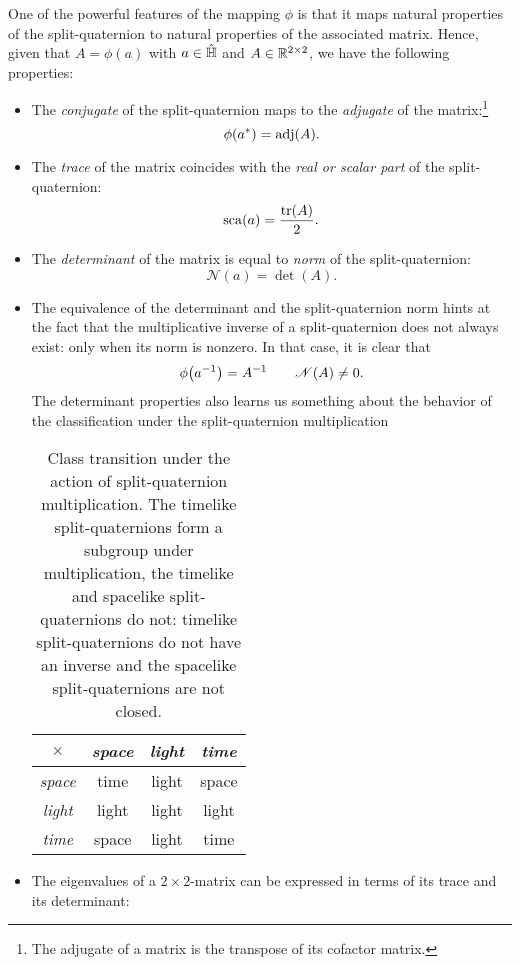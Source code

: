 One of the powerful features of the mapping $\phi$ is that it maps natural properties of the split-quaternion to natural properties of the associated matrix. Hence, given that $A = \phi(a)$ with $a \in \hat{\mathbb{H}}$ and $A \in \mathbb{R}^{2\times2}$, we have the following properties: 
\begin{itemize}
    \item The \emph{conjugate} of the split-quaternion maps to the \emph{adjugate} of the matrix:\footnote
        {The adjugate of a matrix is the transpose of its cofactor matrix.}
        $$ \phi(a^*) = \operatorname{adj}(A). $$
    \item The \emph{trace} of the matrix coincides with the \emph{real or scalar part} of the split-quaternion:
        $$ \scapart{a} = \frac{\trace(A)}{2}. $$
    \item The \emph{determinant} of the matrix is equal to \emph{norm} of the split-quaternion:
        $$ \mathscr{N}(a) = \det(A). $$
    \item The equivalence of the determinant and the split-quaternion norm hints at the fact that the multiplicative inverse of a split-quaternion does not always exist: only when its norm is nonzero. In that case, it is clear that
        $$ \phi\qty(a^{-1}) = A^{-1} \qquad \mathscr{N}(A) \neq 0. $$
    The determinant properties also learns us something about the behavior of the classification under the split-quaternion multiplication
        \begin{table}[h!]
        \centering
        \caption{Class transition under the action of split-quaternion multiplication. The timelike split-quaternions form a subgroup under multiplication, the timelike and spacelike split-quaternions do not: timelike split-quaternions do not have an inverse and the spacelike split-quaternions are not closed.}
        \label{tab:multiplication_class}
        \begin{tabular}{c|ccc}
            \toprule
            $\times$ & \emph{space} & \emph{light} & \emph{time} \\
            \hline
            \emph{space} & time  & light & space \\
            \emph{light} & light & light & light \\
            \emph{time} &  space & light & time \\
            \bottomrule
        \end{tabular}
        \end{table}
    \item The eigenvalues of a $2\times2$-matrix can be expressed in terms of its trace and its determinant:

\end{itemize}
